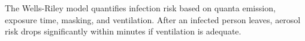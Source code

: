 \documentclass{article}
\newcommand{\D}{\bm{\Delta}}
\begin{document}










The Wells-Riley model quantifies infection risk based on quanta emission, exposure time, masking, and ventilation. After an infected person leaves, aerosol risk drops significantly within minutes if ventilation is adequate.
\end{document}
